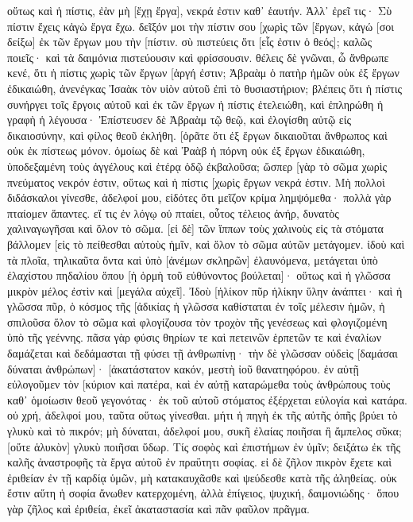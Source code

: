 οὕτως καὶ ἡ πίστις, ἐὰν μὴ [ἔχῃ ἔργα], νεκρά ἐστιν καθ᾽ ἑαυτήν. 
Ἀλλ᾽ ἐρεῖ τις· Σὺ πίστιν ἔχεις κἀγὼ ἔργα ἔχω. δεῖξόν μοι τὴν πίστιν σου [χωρὶς τῶν [ἔργων, κἀγώ [σοι δείξω] ἐκ τῶν ἔργων μου τὴν [πίστιν. 
σὺ πιστεύεις ὅτι [εἷς ἐστιν ὁ θεός]; καλῶς ποιεῖς· καὶ τὰ δαιμόνια πιστεύουσιν καὶ φρίσσουσιν. 
θέλεις δὲ γνῶναι, ὦ ἄνθρωπε κενέ, ὅτι ἡ πίστις χωρὶς τῶν ἔργων [ἀργή ἐστιν; 
Ἀβραὰμ ὁ πατὴρ ἡμῶν οὐκ ἐξ ἔργων ἐδικαιώθη, ἀνενέγκας Ἰσαὰκ τὸν υἱὸν αὐτοῦ ἐπὶ τὸ θυσιαστήριον; 
βλέπεις ὅτι ἡ πίστις συνήργει τοῖς ἔργοις αὐτοῦ καὶ ἐκ τῶν ἔργων ἡ πίστις ἐτελειώθη, 
καὶ ἐπληρώθη ἡ γραφὴ ἡ λέγουσα· Ἐπίστευσεν δὲ Ἀβραὰμ τῷ θεῷ, καὶ ἐλογίσθη αὐτῷ εἰς δικαιοσύνην, καὶ φίλος θεοῦ ἐκλήθη. 
[ὁρᾶτε ὅτι ἐξ ἔργων δικαιοῦται ἄνθρωπος καὶ οὐκ ἐκ πίστεως μόνον. 
ὁμοίως δὲ καὶ Ῥαὰβ ἡ πόρνη οὐκ ἐξ ἔργων ἐδικαιώθη, ὑποδεξαμένη τοὺς ἀγγέλους καὶ ἑτέρᾳ ὁδῷ ἐκβαλοῦσα; 
ὥσπερ [γὰρ τὸ σῶμα χωρὶς πνεύματος νεκρόν ἐστιν, οὕτως καὶ ἡ πίστις [χωρὶς ἔργων νεκρά ἐστιν. 
Μὴ πολλοὶ διδάσκαλοι γίνεσθε, ἀδελφοί μου, εἰδότες ὅτι μεῖζον κρίμα λημψόμεθα· 
πολλὰ γὰρ πταίομεν ἅπαντες. εἴ τις ἐν λόγῳ οὐ πταίει, οὗτος τέλειος ἀνήρ, δυνατὸς χαλιναγωγῆσαι καὶ ὅλον τὸ σῶμα. 
[εἰ δὲ] τῶν ἵππων τοὺς χαλινοὺς εἰς τὰ στόματα βάλλομεν [εἰς τὸ πείθεσθαι αὐτοὺς ἡμῖν, καὶ ὅλον τὸ σῶμα αὐτῶν μετάγομεν. 
ἰδοὺ καὶ τὰ πλοῖα, τηλικαῦτα ὄντα καὶ ὑπὸ [ἀνέμων σκληρῶν] ἐλαυνόμενα, μετάγεται ὑπὸ ἐλαχίστου πηδαλίου ὅπου [ἡ ὁρμὴ τοῦ εὐθύνοντος βούλεται]· 
οὕτως καὶ ἡ γλῶσσα μικρὸν μέλος ἐστὶν καὶ [μεγάλα αὐχεῖ]. Ἰδοὺ [ἡλίκον πῦρ ἡλίκην ὕλην ἀνάπτει· 
καὶ ἡ γλῶσσα πῦρ, ὁ κόσμος τῆς [ἀδικίας ἡ γλῶσσα καθίσταται ἐν τοῖς μέλεσιν ἡμῶν, ἡ σπιλοῦσα ὅλον τὸ σῶμα καὶ φλογίζουσα τὸν τροχὸν τῆς γενέσεως καὶ φλογιζομένη ὑπὸ τῆς γεέννης. 
πᾶσα γὰρ φύσις θηρίων τε καὶ πετεινῶν ἑρπετῶν τε καὶ ἐναλίων δαμάζεται καὶ δεδάμασται τῇ φύσει τῇ ἀνθρωπίνῃ· 
τὴν δὲ γλῶσσαν οὐδεὶς [δαμάσαι δύναται ἀνθρώπων]· [ἀκατάστατον κακόν, μεστὴ ἰοῦ θανατηφόρου. 
ἐν αὐτῇ εὐλογοῦμεν τὸν [κύριον καὶ πατέρα, καὶ ἐν αὐτῇ καταρώμεθα τοὺς ἀνθρώπους τοὺς καθ᾽ ὁμοίωσιν θεοῦ γεγονότας· 
ἐκ τοῦ αὐτοῦ στόματος ἐξέρχεται εὐλογία καὶ κατάρα. οὐ χρή, ἀδελφοί μου, ταῦτα οὕτως γίνεσθαι. 
μήτι ἡ πηγὴ ἐκ τῆς αὐτῆς ὀπῆς βρύει τὸ γλυκὺ καὶ τὸ πικρόν; 
μὴ δύναται, ἀδελφοί μου, συκῆ ἐλαίας ποιῆσαι ἢ ἄμπελος σῦκα; [οὔτε ἁλυκὸν] γλυκὺ ποιῆσαι ὕδωρ. 
Τίς σοφὸς καὶ ἐπιστήμων ἐν ὑμῖν; δειξάτω ἐκ τῆς καλῆς ἀναστροφῆς τὰ ἔργα αὐτοῦ ἐν πραΰτητι σοφίας. 
εἰ δὲ ζῆλον πικρὸν ἔχετε καὶ ἐριθείαν ἐν τῇ καρδίᾳ ὑμῶν, μὴ κατακαυχᾶσθε καὶ ψεύδεσθε κατὰ τῆς ἀληθείας. 
οὐκ ἔστιν αὕτη ἡ σοφία ἄνωθεν κατερχομένη, ἀλλὰ ἐπίγειος, ψυχική, δαιμονιώδης· 
ὅπου γὰρ ζῆλος καὶ ἐριθεία, ἐκεῖ ἀκαταστασία καὶ πᾶν φαῦλον πρᾶγμα. 
